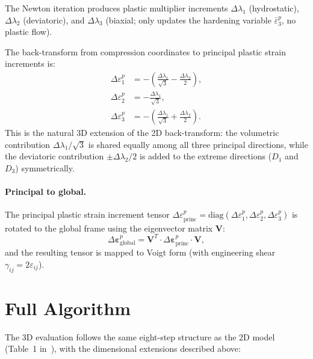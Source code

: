 The Newton iteration produces plastic multiplier increments
$\Delta\lambda_1$ (hydrostatic), $\Delta\lambda_2$ (deviatoric), and
$\Delta\lambda_3$ (biaxial; only updates the hardening variable
$\bar\varepsilon^p_3$, no plastic flow).

The back-transform from compression coordinates to principal plastic strain
increments is:
\begin{align}
  \Delta\varepsilon^p_1 &= -\!\left(\frac{\Delta\lambda_1}{\sqrt{3}} - \frac{\Delta\lambda_2}{2}\right), \\
  \Delta\varepsilon^p_2 &= -\frac{\Delta\lambda_1}{\sqrt{3}}, \\
  \Delta\varepsilon^p_3 &= -\!\left(\frac{\Delta\lambda_1}{\sqrt{3}} + \frac{\Delta\lambda_2}{2}\right).
\end{align}
This is the natural 3D extension of the 2D back-transform: the volumetric
contribution $\Delta\lambda_1/\sqrt{3}$ is shared equally among all three
principal directions, while the deviatoric contribution $\pm\Delta\lambda_2/2$
is added to the extreme directions ($D_1$ and $D_3$) symmetrically.

\paragraph{Principal to global.}
The principal plastic strain increment tensor
$\Delta\varepsilon^p_{\text{princ}} = \mathrm{diag}(\Delta\varepsilon^p_1,
\Delta\varepsilon^p_2, \Delta\varepsilon^p_3)$
is rotated to the global frame using the eigenvector matrix $\mathbf{V}$:
\[
  \Delta\boldsymbol{\varepsilon}^p_{\text{global}} = \mathbf{V}^T \cdot
  \Delta\boldsymbol{\varepsilon}^p_{\text{princ}} \cdot \mathbf{V},
\]
and the resulting tensor is mapped to Voigt form (with engineering shear
$\gamma_{ij} = 2\varepsilon_{ij}$).


\section{Full Algorithm}
\label{sec:kb3d-algorithm}

The 3D evaluation follows the same eight-step structure as the 2D model
(Table~1 in~\cite{KoBathe2026}), with the dimensional extensions described
above:

